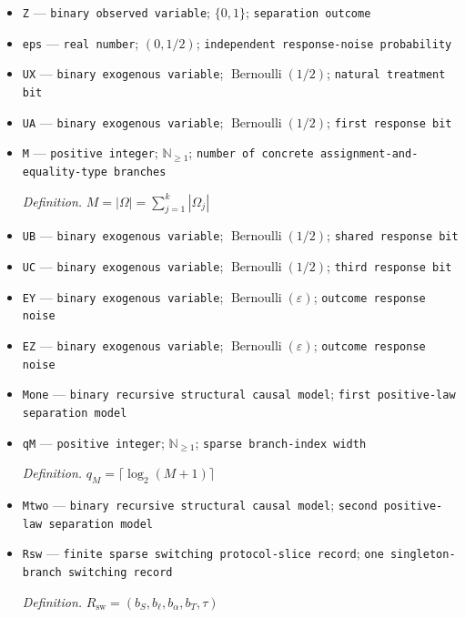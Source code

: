 \documentclass{article}
\begin{document}
\begin{itemize}
  \item \texttt{Z} --- \texttt{binary observed variable}; \(\{0,1\}\); \texttt{separation outcome}
  \item \texttt{eps} --- \texttt{real number}; \((0,1/2)\); \texttt{independent response-\allowbreak{}noise probability}
  \item \texttt{UX} --- \texttt{binary exogenous variable}; \(\operatorname{Bernoulli}(1/2)\); \texttt{natural treatment bit}
  \item \texttt{UA} --- \texttt{binary exogenous variable}; \(\operatorname{Bernoulli}(1/2)\); \texttt{first response bit}
  \item \texttt{M} --- \texttt{positive integer}; \(\mathbb N_{\ge 1}\); \texttt{number of concrete assignment-\allowbreak{}and-\allowbreak{}equality-\allowbreak{}type branches}
  \par\smallskip\noindent\emph{Definition.} \(M=|\Omega|=\sum_{j=1}^{k}|\Omega_j|\)
  \item \texttt{UB} --- \texttt{binary exogenous variable}; \(\operatorname{Bernoulli}(1/2)\); \texttt{shared response bit}
  \item \texttt{UC} --- \texttt{binary exogenous variable}; \(\operatorname{Bernoulli}(1/2)\); \texttt{third response bit}
  \item \texttt{EY} --- \texttt{binary exogenous variable}; \(\operatorname{Bernoulli}(\varepsilon)\); \texttt{outcome response noise}
  \item \texttt{EZ} --- \texttt{binary exogenous variable}; \(\operatorname{Bernoulli}(\varepsilon)\); \texttt{outcome response noise}
  \item \texttt{Mone} --- \texttt{binary recursive structural causal model}; \texttt{first positive-\allowbreak{}law separation model}
  \item \texttt{qM} --- \texttt{positive integer}; \(\mathbb N_{\ge1}\); \texttt{sparse branch-\allowbreak{}index width}
  \par\smallskip\noindent\emph{Definition.} \(q_M=\lceil\log_2(M+1)\rceil\)
  \item \texttt{Mtwo} --- \texttt{binary recursive structural causal model}; \texttt{second positive-\allowbreak{}law separation model}
  \item \texttt{Rsw} --- \texttt{finite sparse switching protocol-\allowbreak{}slice record}; \texttt{one singleton-\allowbreak{}branch switching record}
  \par\smallskip\noindent\emph{Definition.} \(R_{\mathrm{sw}}=(b_S,b_{\ell},b_{\alpha},b_T,\tau)\)

\end{itemize}
\end{document}
